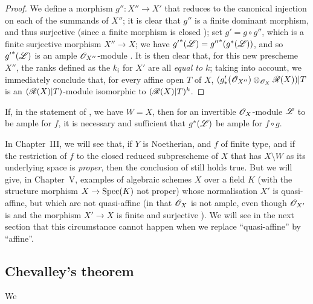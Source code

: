 \begin{proof}
We define a morphism $g'':X''\to X'$ that reduces to the canonical injection on each of the summands of $X''$;
it is clear that $g''$ is a finite dominant morphism, and thus surjective (since a finite morphism is closed );
set $g'=g\circ g''$, which is a finite surjective morphism $X''\to X$;
we have ${g'}^*(\mathscr{L})={g''}^*(g^*(\mathscr{L}))$, and so ${g'}^*(\mathscr{L})$ is an ample $\mathscr{O}_{X''}$-module .
It is then clear that, for this new prescheme $X''$, the ranks defined as the $k_i$ for $X'$ are all \emph{equal to $k$};
taking  into account, we immediately conclude that, for every affine open $T$ of $X$, $(g'_*(\mathscr{O}_{X''})\otimes_{\mathscr{O}_X}\mathscr{R}(X))|T$ is an $(\mathscr{R}(X)|T)$-module isomorphic to $(\mathscr{R}(X)|T)^k$.
\end{proof}

\begin{corollary}[6.6.12]
\label{II.6.6.12}
If, in the statement of , we have $W=X$, then for an invertible $\mathscr{O}_X$-module $\mathscr{L}$ to be ample for $f$, it is necessary and sufficient that $g^*(\mathscr{L})$ be ample for $f\circ g$.
\end{corollary}

\begin{remark}[6.6.13]
\label{II.6.6.13}
In Chapter~III, we will see that, if $Y$ is Noetherian, and $f$ of finite type, and if the restriction of $f$ to the closed reduced subprescheme of $X$ that has $X\setminus W$ as its underlying space is \emph{proper}, then the conclusion of  still holds true.
But we will give, in Chapter~V, examples of algebraic schemes $X$ over a field $K$ (with the structure morphism $X\to\Spec(K)$ not proper) whose normalisation $X'$ is quasi-affine, but which are not quasi-affine (in that $\mathscr{O}_X$ is not ample, even though $\mathscr{O}_{X'}$ is  and the morphism $X'\to X$ is finite and surjective ).
We will see in the next section that this circumstance cannot happen when we replace ``quasi-affine'' by ``affine''.
\end{remark}


\subsection{Chevalley's theorem}
\label{subsection:II.6.7}

We
